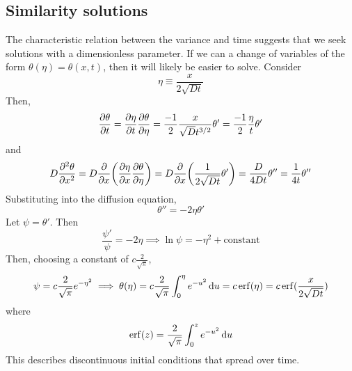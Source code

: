\subsection{Similarity solutions}
The characteristic relation between the variance and time suggests that we seek solutions with a dimensionless parameter.
If we can a change of variables of the form \( \theta(\eta) = \theta(x,t) \), then it will likely be easier to solve.
Consider
\[
	\eta \equiv \frac{x}{2\sqrt{Dt}}
\]
Then,
\[
	\pdv{\theta}{t} = \pdv{\eta}{t} \pdv{\theta}{\eta} = \frac{-1}{2} \frac{x}{\sqrt{D} t^{3/2}} \theta' = \frac{-1}{2} \frac{\eta}{t} \theta'
\]
and
\[
	D \pdv[2]{\theta}{x} = D \pdv{x} \qty(\pdv{\eta}{x} \pdv{\theta}{\eta}) = D \pdv{x} \qty(\frac{1}{2\sqrt{Dt}} \theta') = \frac{D}{4Dt} \theta'' = \frac{1}{4t} \theta''
\]
Substituting into the diffusion equation,
\[
	\theta'' = -2 \eta \theta'
\]
Let \( \psi = \theta' \).
Then
\[
	\frac{\psi'}{\psi} = -2\eta \implies \ln \psi = -\eta^2 + \text{constant}
\]
Then, choosing a constant of \( c\frac{2}{\sqrt{\pi}} \),
\[
	\psi = c\frac{2}{\sqrt{\pi}} e^{-\eta^2} \implies \theta(\eta) = c\frac{2}{\sqrt{\pi}} \int_0^\eta e^{-u^2} \dd{u} = c \erf(\eta) = c \erf(\frac{x}{2\sqrt{Dt}})
\]
where
\[
	\erf(z) = \frac{2}{\sqrt{\pi}} \int_0^z e^{-u^2} \dd{u}
\]
This describes discontinuous initial conditions that spread over time.

